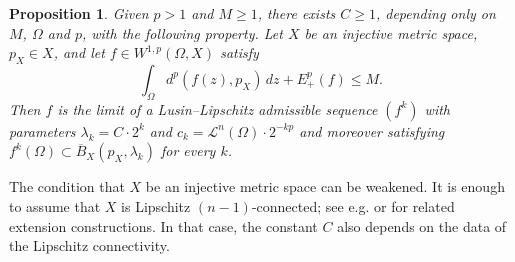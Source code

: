 \documentclass[a4paper,leqno]{amsart}
\numberwithin{equation}{section}
\newtheorem{proposition}[theorem]{Proposition}
\theoremstyle{remark}
\theoremstyle{remark}
\newcommand{\lm}{\mathscr{L}}
\begin{document}
\begin{proposition}\label{prop:Sobolev-limit-admissible-sequence}
Given $p > 1$ and $M \geq 1$, there exists $C \geq 1$, depending only on $M$, $\Omega$ and $p$, with the following property. Let $X$ be an injective metric space, $p_X\in X$, and let $f\in W^{1,p}(\Omega, X)$ satisfy $$\int_\Omega d^p(f(z), p_X)\,dz+ E_+^p(f)\leq M.$$ Then $f$ is the limit of a Lusin--Lipschitz admissible sequence $(f^k)$ with parameters $\lambda_k = C \cdot 2^{k}$ and $c_k= \lm^n(\Omega) \cdot 2^{-kp}$ and moreover satisfying $f^k(\Omega)\subset \overline{B}_{ X }(p_X, \lambda_k)$ for every $k$.
\end{proposition}

The condition that $X$ be an injective metric space can be weakened. It is enough to assume that $X$ is Lipschitz $(n-1)$-connected; see e.g. \cite{lang-schlichenmaier-2005-nagata-dimension-quasisymmetric-embeddings-and-lipschitz-extensions} or \cite{hajlasz-schikorra-2014-lipschitz-homotopy-and-density-of-lipschitz-mappings-in-sobolev-spaces} for related extension constructions. In that case, the constant $C$ also depends on the data of the Lipschitz connectivity.
\end{document}
